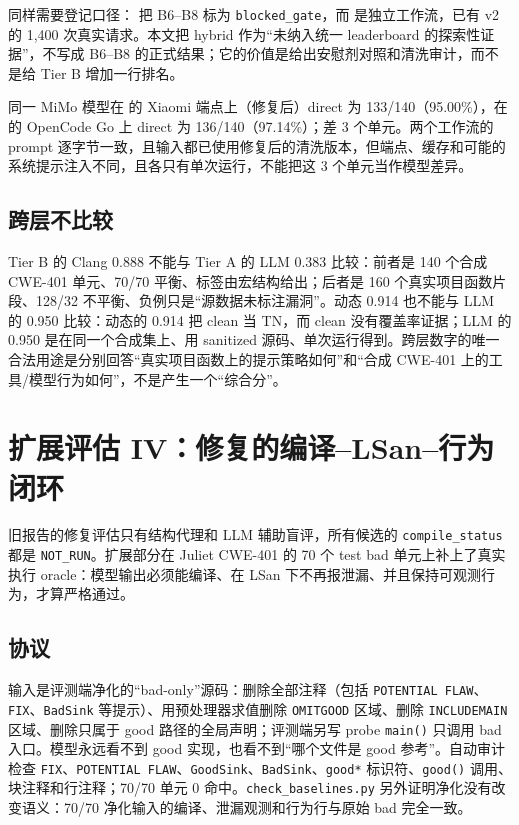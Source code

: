 \documentclass[conference]{IEEEtran}
\begin{document}
同样需要登记口径： 把 B6--B8 标为 \texttt{blocked\_gate}，而  是独立工作流，已有 v2 的 1{,}400 次真实请求。本文把 hybrid 作为“未纳入统一 leaderboard 的探索性证据”，不写成 B6--B8 的正式结果；它的价值是给出安慰剂对照和清洗审计，而不是给 Tier B 增加一行排名。

同一 MiMo 模型在  的 Xiaomi 端点上（修复后）direct 为 133/140（95.00\%），在  的 OpenCode Go 上 direct 为 136/140（97.14\%）；差 3 个单元。两个工作流的 prompt 逐字节一致，且输入都已使用修复后的清洗版本，但端点、缓存和可能的系统提示注入不同，且各只有单次运行，不能把这 3 个单元当作模型差异。

\subsection{跨层不比较}
Tier B 的 Clang 0.888 不能与 Tier A 的 LLM 0.383 比较：前者是 140 个合成 CWE-401 单元、70/70 平衡、标签由宏结构给出；后者是 160 个真实项目函数片段、128/32 不平衡、负例只是“源数据未标注漏洞”。动态 0.914 也不能与 LLM 的 0.950 比较：动态的 0.914 把 clean 当 TN，而 clean 没有覆盖率证据；LLM 的 0.950 是在同一个合成集上、用 sanitized 源码、单次运行得到。跨层数字的唯一合法用途是分别回答“真实项目函数上的提示策略如何”和“合成 CWE-401 上的工具/模型行为如何”，不是产生一个“综合分”。

\section{扩展评估 IV：修复的编译--LSan--行为闭环}
\label{sec:ext-repair}

旧报告的修复评估只有结构代理和 LLM 辅助盲评，所有候选的 \texttt{compile\_status} 都是 \texttt{NOT\_RUN}。扩展部分在 Juliet CWE-401 的 70 个 test bad 单元上补上了真实执行 oracle：模型输出必须能编译、在 LSan 下不再报泄漏、并且保持可观测行为，才算严格通过。

\subsection{协议}
输入是评测端净化的“bad-only”源码：删除全部注释（包括 \texttt{POTENTIAL FLAW}、\texttt{FIX}、\texttt{BadSink} 等提示）、用预处理器求值删除 \texttt{OMITGOOD} 区域、删除 \texttt{INCLUDEMAIN} 区域、删除只属于 good 路径的全局声明；评测端另写 probe \texttt{main()} 只调用 bad 入口。模型永远看不到 good 实现，也看不到“哪个文件是 good 参考”。自动审计检查 \texttt{FIX}、\texttt{POTENTIAL FLAW}、\texttt{GoodSink}、\texttt{BadSink}、\texttt{good*} 标识符、\texttt{good()} 调用、块注释和行注释；70/70 单元 0 命中。\texttt{check\_baselines.py} 另外证明净化没有改变语义：70/70 净化输入的编译、泄漏观测和行为行与原始 bad 完全一致。
\end{document}
